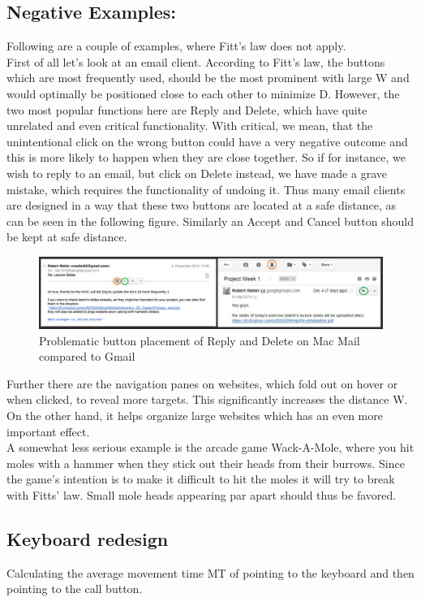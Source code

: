 \documentclass[a4paper,twoside,10pt]{article}
\begin{document}
\subsection*{Negative Examples:} Following are a couple of examples, where Fitt's law does not apply.\\
First of all let's look at an email client. According to Fitt's law, the buttons which are most frequently used, should be the most prominent with large W and would optimally be positioned close to each other to minimize D. However, the two most popular functions here are Reply and Delete, which have quite unrelated and even critical functionality. With critical, we mean, that the unintentional click on the wrong button could have a very negative outcome and this is more likely to happen when they are close together. So if for instance, we wish to reply to an email, but click on Delete instead, we have made a grave mistake, which requires the functionality of undoing it. Thus many email clients are designed in a way that these two buttons are located at a safe distance, as can be seen in the following figure. Similarly an Accept and Cancel button should be kept at safe distance.

\begin{figure}[ht]
	\centering
		\includegraphics[width=1.00\textwidth]{mailfail.pdf}
	\caption{Problematic button placement of Reply and Delete on Mac Mail compared to Gmail}
	\label{fig:mailfail}
\end{figure}

Further there are the navigation panes on websites, which fold out on hover or when clicked, to reveal more targets. This significantly increases the distance W. On the other hand, it helps organize large websites which has an even more important effect.\\A somewhat less serious example is the arcade game Wack-A-Mole, where you hit moles with a hammer when they stick out their heads from their burrows. Since the game's intention is to make it difficult to hit the moles it will try to break with Fitts' law. Small mole heads appearing par apart should thus be favored.


\subsection{Keyboard redesign} 
Calculating the average movement time MT of pointing to the keyboard and then pointing to the call button.
\end{document}
